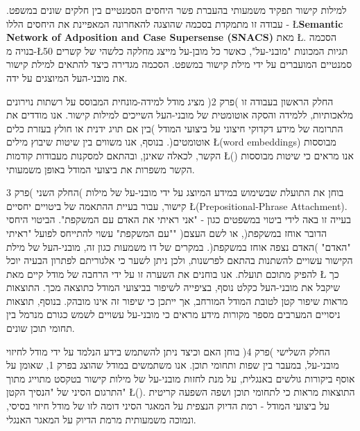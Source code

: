 \documentclass[
11pt, %
oneside, %
hebrew, english,
singlespacing, %
nohyperref, %
headsepline, %
]{MastersDoctoralThesis} %
\begin{document}

\begin{hebabstract}
למילות קישור תפקיד משמעותי בהעברת פשר היחסים הסמנטיים בין חלקים שונים במשפט. עבודה זו מתמקדת בסכמה שהוצגה להאחרונה המאפיינת את היחסים הללו -
\L{\textbf{Semantic Network of Adposition and Case Supersense (SNACS)}}
מאת \L{\cite{snacs}}.
הסכמה בנויה מ-\L{50} תגיות המכונות "מובני-על", כאשר כל מובן-על מייצג מחלקה כלשהי של קשרים סמנטיים המועברים על ידי מילת קישור במשפט. הסכמה מגדירה כיצד להתאים למילת קישור את מובני-העל המיוצגים על ידה. 

החלק הראשון בעבודה זו )פרק 2( מציג מודל למידה-מונחית המבוסס על רשתות נוירונים מלאכותיות, ללמידה והסקה אוטומטית של מובני-העל השייכים למילות קישור. 
אנו מודדים את התרומה של מידע דקדוקי חיצוני על ביצועי המודל )בין אם תויג ידנית או חולץ בעזרת כלים אוטומטים(. בנוסף, אנו משווים בין שיטות שיבוץ מילים \L{(word embeddings)}
מבוססות הקשר, לכאלה שאינן, ובהתאם למסקנות מעבודות קודמות \L{(\cite{nelson})}
אנו מראים כי שיטות מבוססות הקשר משפרות את ביצועי המודל באופן משמעותי. 


 החלק השני )פרק 3( בוחן את התועלת שבשימוש במידע המיוצג על ידי מובני-על של מילות קישור, עבור בעיית ההתאמה של ביטויים יחסיים \L{(Prepositional-Phrase Attachment)}.
 בעייה זו באה לידי ביטוי במשפטים כגון - "אני ראיתי את האדם עם המשקפת". הביטוי היחסי "עם המשקפת" עשוי להתייחס לפועל "ראיתי" )הדובר אוחז במשקפת(, או לשם העצם "האדם" )האדם נצפה אוחז במשקפת(. במקרים של דו משמעות כגון זה, מובני-העל של מילת הקישור עשויים להשתנות בהתאם לפרשנות, ולכן ניתן לשער כי אלגוריתם לפתרון הבעיה יוכל להפיק מתוכם תועלת. אנו בוחנים את השערה זו על ידי הרחבה של מודל קיים מאת \L{\cite{hpcd}}
 כך שיקבל את מובני-העל כקלט נוסף, בציפייה לשיפור בביצועי המודל כתוצאה מכך. 
התוצאות מראות שיפור קטן לטובת המודל המורחב, אך ייתכן כי שיפור זה אינו מובהק. בנוסף, תוצאות ניסויים המערבים מספר מקורות מידע מראים כי מובני-על עשויים לשמש כגורם מנרמל בין תחומי תוכן שונים.

החלק השלישי )פרק 4( בוחן האם וכיצד ניתן להשתמש בידע הנלמד על ידי מודל לחיזוי מובני-על, במעבר בין שפות ותחומי תוכן. 
אנו משתמשים במודל שהוצג בפרק 1, שאומן על אוסף ביקורות גולשים באנגלית, על מנת לחזות מובני-על של מילות קישור בטקסט מתוייג מתוך התרגום הסיני של "הנסיך הקטן" \L{(\cite{chinesecorpus})}. התוצאות מראות כי לתחומי תוכן ושפה השפעה קריטית על ביצועי המודל - רמת הדיוק הנצפית על המאגר הסיני דומה לזו של מודל חיזוי בסיסי, ונמוכה משמעותית מרמת הדיוק על המאגר האנגלי.





\end{hebabstract}
\end{document}
